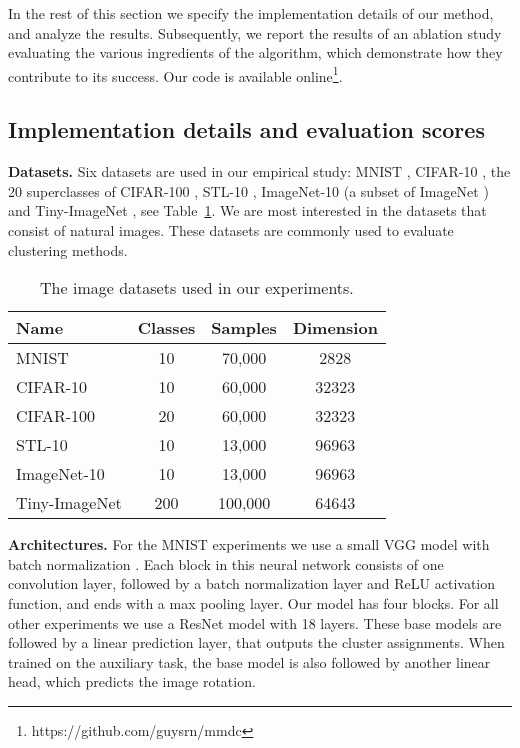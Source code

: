 \documentclass[a4paper,conference]{IEEEtran}
\begin{document}
In the rest of this section we specify the implementation details of our method, and analyze the results. Subsequently, we report the results of an ablation study evaluating the various ingredients of the algorithm, which demonstrate how they contribute to its success. Our code is available online\footnote{https://github.com/guysrn/mmdc}. 

\subsection{Implementation details and evaluation scores}
\label{sec:impl-det}

\textbf{Datasets.} Six datasets are used in our empirical study: MNIST \cite{Lecun98gradient-basedlearning}, CIFAR-10 \cite{cifar10}, the 20 superclasses of CIFAR-100 \cite{cifar10}, STL-10 \cite{stl10}, ImageNet-10 (a subset of ImageNet \cite{imagenet2009}) and Tiny-ImageNet \cite{imagenet2009}, see Table~\ref{table:datasets}. We are most interested in the datasets that consist of natural images. These datasets are commonly used to evaluate clustering methods.

\begin{table}[h]
\begin{center}
\caption{The image datasets used in our experiments.}
\label{table:datasets}
\begin{tabular}{l c c c}
\toprule
Name & Classes & Samples & Dimension \\
\midrule
MNIST & 10 & 70,000 & 2828 \\
CIFAR-10 & 10 & 60,000 & 32323 \\
CIFAR-100 & 20 & 60,000 & 32323 \\
STL-10 & 10 & 13,000 & 96963 \\
ImageNet-10 & 10 & 13,000 & 96963 \\
Tiny-ImageNet & 200 & 100,000 & 64643 \\
\bottomrule
\end{tabular}
\end{center}
\end{table}

\textbf{Architectures.} 
For the MNIST experiments we use a small VGG model \cite{vgg} with batch normalization \cite{Ioffe2015BatchNA}. Each block in this neural network consists of one convolution layer, followed by a batch normalization layer and ReLU activation function, and ends with a max pooling layer. Our model has four blocks. For all other experiments we use a ResNet model \cite{2015DeepRL} with 18 layers. These base models are followed by a linear prediction layer, that outputs the cluster assignments. When trained on the auxiliary task, the base model is also followed by another linear head, which predicts the image rotation.
\end{document}
